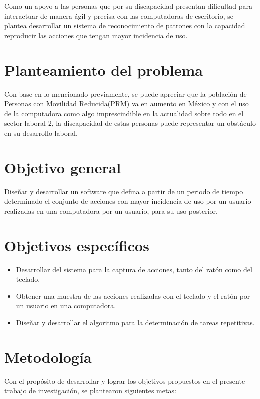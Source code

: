  
Como un apoyo a las personas que por su discapacidad presentan dificultad para
 interactuar de manera ágil y precisa con las computadoras de escritorio, se
 plantea desarrollar un sistema de reconocimiento de patrones con la capacidad
 reproducir las acciones que tengan mayor incidencia de uso.

\section{Planteamiento del problema}
Con base en lo mencionado previamente, se puede apreciar que la población de
 Personas con Movilidad Reducida(PRM) va en aumento en México y con el uso de
 la computadora como algo imprescindible en la actualidad sobre todo en el
 sector laboral 2, la discapacidad de estas personas puede representar un
 obstáculo en su desarrollo laboral.



\section{Objetivo general} 
Diseñar y desarrollar un software que defina a partir de un periodo de tiempo
 determinado el conjunto de acciones con mayor incidencia de uso por un usuario
 realizadas en una computadora por un usuario, para su uso posterior.

\section{Objetivos específicos}
\begin{itemize}
  \item Desarrollar del sistema para la captura de acciones, tanto del  ratón
  como del teclado.
  \item Obtener una muestra de las acciones realizadas con el teclado y el 
  ratón por un usuario en una computadora.
  \item Diseñar y desarrollar el algoritmo para la determinación de tareas
  repetitivas.
\end{itemize}


\section{Metodología}
Con el propósito de desarrollar y lograr los objetivos propuestos en el presente trabajo de investigación, se plantearon siguientes metas:

